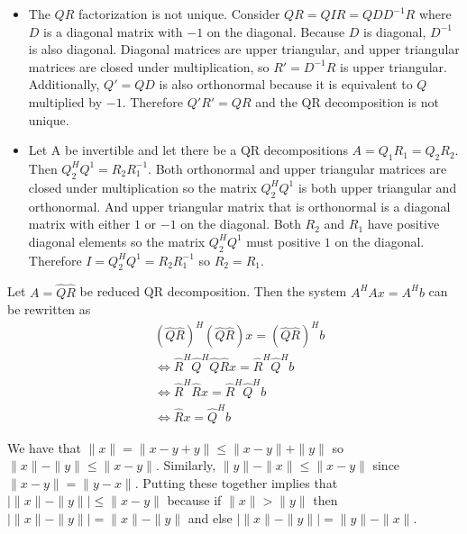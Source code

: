 \documentclass[12pt]{article}
\newenvironment{problem}[2][Problem]{\begin{trivlist}
\item[\hskip \labelsep {\bfseries #1}\hskip \labelsep {\bfseries #2}]}{\end{trivlist}}
\begin{document}
\begin{problem}{16.} \hfill
\begin{itemize}
\item [(i)] The $QR$ factorization is not unique. Consider $QR = QIR = QDD^{-1}R$ where $D$ is a diagonal matrix with $-1$ on the diagonal. Because $D$ is diagonal, $D^{-1}$ is also diagonal. Diagonal matrices are upper triangular, and upper triangular matrices are closed under multiplication, so $R' = D^{-1}R$ is upper triangular. Additionally, $Q'  = QD$ is also orthonormal because it is equivalent to $Q$ multiplied by $-1$. Therefore $Q'R' = QR$ and the QR decomposition is not unique.
 
\item [(ii)] Let A be invertible and let there be a QR decompositions $A = Q_1R_1 = Q_2R_2$.  Then $Q_2^HQ^1 = R_2R_1^{-1}$. Both orthonormal and upper triangular matrices are closed under multiplication so the matrix $Q_2^HQ^1$ is both upper triangular and orthonormal. And upper triangular matrix that is orthonormal is a diagonal matrix with either $1$ or $-1$ on the diagonal. Both $R_2$  and  $R_1$ have positive diagonal elements so the matrix $Q_2^HQ^1$ must positive $1$ on the diagonal.  Therefore $I = Q_2^HQ^1 = R_2R_1^{-1}$ so $R_2 = R_1$. 
\end{itemize} 
\end{problem}

\begin{problem}{17.} 
Let $A = \widehat{Q}\widehat{R}$ be reduced QR decomposition. Then the system $A^HAx = A^Hb$ can be rewritten as 
\begin{equation*}
\begin{aligned}
&(\widehat{Q}\widehat{R})^H(\widehat{Q}\widehat{R})x = (\widehat{Q}\widehat{R})^Hb\\
& \Leftrightarrow \widehat{R}^H\widehat{Q}^H\widehat{Q}\widehat{R}x = \widehat{R}^H\widehat{Q}^Hb \\ &\Leftrightarrow \widehat{R}^H\widehat{R}x = \widehat{R}^H\widehat{Q}^Hb \\
&\Leftrightarrow \widehat{R}x = \widehat{Q}^Hb 
\end{aligned}
\end{equation*}
\end{problem}

\begin{problem}{23.} 
We have that $\|x\| = \|x - y + y\| \leq \|x-y\| + \|y\|$ so  $\|x\| - \|y\|  \leq \|x-y\| $. Similarly, $\|y\| - \|x\|  \leq \|x-y\|$ since $\|x-y\| = \|y-x\|$. Putting these together implies that $|\|x\| - \|y\|| \leq \|x-y\|$ because if $\|x\| > \|y\|$ then $|\|x\| - \|y\|| =  \|x\| - \|y\| $ and else $|\|x\| - \|y\|| = \|y\| - \|x\|$.
\end{problem}
\end{document}
